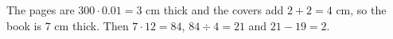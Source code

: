 The pages are $300\cdot0.01=3$ cm thick and the covers add $2+2=4$ cm, so the book is $7$ cm thick. Then $7\cdot12=84$, $84\div4=21$ and $21-19=\boxed{2}$.
